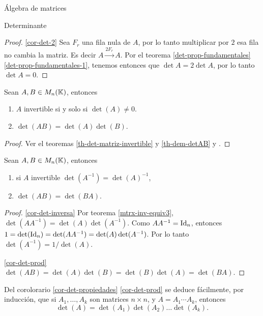 \begin{chapter}{\'Algebra de matrices}
\begin{section}{Determinante}
\begin{proof}
        \ref{cor-det-2} Sea $F_r$ una fila nula de $A$, por lo tanto multiplicar por $2$ esa fila no cambia la matriz. Es decir $A  \stackrel{2F_r}{\longrightarrow} A$. Por el teorema \ref{det-prop-fundamentales} \ref{det-prop-fundamentales-1}, tenemos entonces que $\det A = 2\det A$, por lo tanto  $\det A =0$.
    \end{proof}
    
    
    
    \begin{teorema} \label{mtrx-inv-equiv3} Sean $A,B \in M_n(\mathbb K)$, entonces
        \begin{enumerate}
            \item $A$ invertible si y solo si  $\det(A)\ne0$.
            \item $\det (A B) = \det(A)\det(B)$. 
        \end{enumerate}
    \end{teorema}
\begin{proof}
    Ver el teoremas \ref{th-det-matriz-invertible} y \ref{th-dem-detAB} y .
\end{proof}

    \begin{corolario}\label{cor-det-propiedades}  Sean $A,B \in M_n(\mathbb K)$, entonces
        \begin{enumerate}
            \item\label{cor-det-inversa} si $A$ invertible $\det(A^{-1}) = \det(A)^{-1}$,
            \item\label{cor-det-prod} $\det (AB) = \det(BA)$.
            \end{enumerate}
    \end{corolario} 
    \begin{proof} 

        \ref{cor-det-inversa}  Por teorema \ref{mtrx-inv-equiv3}, $\det(AA^{-1}) = \det(A)\det(A^{-1})$. Como $AA^{-1} = \operatorname{Id}_n$, entonces $1 =\det(\operatorname{Id}_n) =  \det(AA^{-1}) = \det(A)\det(A^{-1})$. Por lo tanto  $\det(A^{-1}) = 1/\det(A)$.

        \ref{cor-det-prod}
        $\det (AB) = \det(A)\det(B) = \det(B)\det(A) = \det(BA)$.
    \end{proof}

    \begin{observacion*} Del  corolorario \ref{cor-det-propiedades} \ref{cor-det-prod} se deduce fácilmente,  por inducción, que si $A_1, \ldots, A_k$ son matrices $n \times n$,  y $A =  A_1 \cdots A_k$, entonces
    \begin{equation}\label{eq-prod-det}
        \det(A) =\det(A_1)\det(A_2) \ldots \det(A_k).
    \end{equation}
        

\end{observacion*}
\end{section}
\end{chapter}
